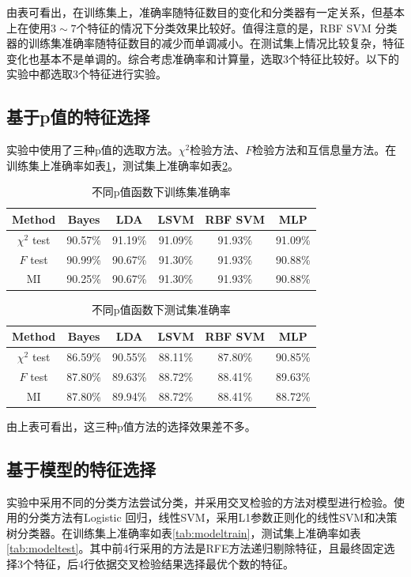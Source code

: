 	由表可看出，在训练集上，准确率随特征数目的变化和分类器有一定关系，但基本上在使用$3\sim 7$个特征的情况下分类效果比较好。值得注意的是，{\ttfamily RBF SVM} 分类器的训练集准确率随特征数目的减少而单调减小。在测试集上情况比较复杂，特征变化也基本不是单调的。综合考虑准确率和计算量，选取3个特征比较好。以下的实验中都选取3个特征进行实验。

	\subsection{基于p值的特征选择}
	实验中使用了三种p值的选取方法。$\chi^2$检验方法、$F$检验方法和互信息量方法。在训练集上准确率如表\ref{tab:pvaluetrain}，测试集上准确率如表\ref{tab:pvaluetest}。

	\begin{table}[htbp]
	\centering
	\begin{tabular}{cccccc}
	\toprule
	Method &   Bayes &     LDA &    LSVM & RBF SVM &     MLP \\
	\midrule
	$\chi^2$ test &  90.57\% &  91.19\% &  91.09\% &  91.93\% &  91.09\% \\
	$F$ test &  90.99\% &  90.67\% &  91.30\% &  91.93\% &  90.88\% \\
	MI &  90.25\% &  90.67\% &  91.30\% &  91.93\% &  90.88\% \\
	\bottomrule
	\end{tabular}
	\caption{不同p值函数下训练集准确率}
	\label{tab:pvaluetrain}
	\end{table}

	\begin{table}[htbp]
	\centering
	\begin{tabular}{cccccc}
	\toprule
	Method &   Bayes &     LDA &    LSVM & RBF SVM &     MLP \\
	\midrule
	$\chi^2$ test &  86.59\% &  90.55\% &  88.11\% &  87.80\% &  90.85\% \\
	$F$ test &  87.80\% &  89.63\% &  88.72\% &  88.41\% &  89.63\% \\
	MI &  87.80\% &  89.94\% &  88.72\% &  88.41\% &  88.72\% \\
	\bottomrule
	\end{tabular}
	\caption{不同p值函数下测试集准确率}
	\label{tab:pvaluetest}
	\end{table}

	由上表可看出，这三种p值方法的选择效果差不多。

	\subsection{基于模型的特征选择}
	实验中采用不同的分类方法尝试分类，并采用交叉检验的方法对模型进行检验。使用的分类方法有{\ttfamily Logistic} 回归，线性{\ttfamily SVM}，采用L1参数正则化的线性{\ttfamily SVM}和决策树分类器。在训练集上准确率如表\ref{tab:modeltrain}，测试集上准确率如表\ref{tab:modeltest}。其中前4行采用的方法是{\ttfamily RFE}方法递归剔除特征，且最终固定选择3个特征，后4行依据交叉检验结果选择最优个数的特征。

